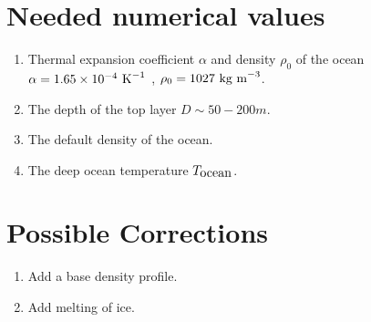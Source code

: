 \documentclass[fontsize = 13pt]{scrartcl}
\begin{document}
\section{Needed numerical values}
\begin{enumerate}
    \item Thermal expansion coefficient \(\alpha\) and density $\rho_0$ of the ocean\\
        \(\alpha = 1.65 \times 10^{-4}\mbox{ K}^{-1}\) , \(\rho_0 =  1027 \mbox{ kg m}^{-3}\).
    \item The depth of the top layer \(D \sim 50 -200 m\).
    \item The default density of the ocean.
    \item The deep ocean temperature \(T_{\mbox{ocean}}\).
\end{enumerate}
\section{Possible Corrections}
\begin{enumerate}
    \item Add a base density profile.
    \item Add melting of ice.
\end{enumerate}
\end{document}
